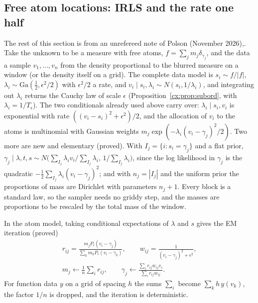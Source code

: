 \subsection{Free atom locations: IRLS and the rate one half}\label{cx:sec:irls}

The rest of this section is from an unrefereed note of Polson (November 2026),. Take the unknown to be a measure with free atoms, $f=\sum_jm_j\delta_{\gamma_j}$, and the data a sample $v_1,\dots,v_n$ from the density proportional to the blurred measure on a window (or the density itself on a grid). The complete data model is $s_i\sim f/|f|$, $\lambda_i\sim\mathrm{Ga}(\tfrac12,\epsilon^2/2)$ with $\epsilon^2/2$ a rate, and $v_i\mid s_i,\lambda_i\sim N(s_i,1/\lambda_i)$, and integrating out $\lambda_i$ returns the Cauchy law of scale $\epsilon$ (Proposition~\ref{cx:prop:subord}, with $\lambda_i=1/T_\epsilon$). The two conditionals already used above carry over: $\lambda_i\mid s_i,v_i$ is exponential with rate $((v_i-s_i)^2+\epsilon^2)/2$, and the allocation of $v_i$ to the atoms is multinomial with Gaussian weights $m_j\exp(-\lambda_i(v_i-\gamma_j)^2/2)$. Two more are new and elementary (proved). With $I_j=\{i:s_i=\gamma_j\}$ and a flat prior, $\gamma_j\mid\lambda,t,s\sim N\bigl(\sum_{I_j}\lambda_iv_i/\sum_{I_j}\lambda_i,\,1/\sum_{I_j}\lambda_i\bigr)$, since the log likelihood in $\gamma_j$ is the quadratic $-\tfrac12\sum_{I_j}\lambda_i(v_i-\gamma_j)^2$; and with $n_j=|I_j|$ and the uniform prior the proportions of mass are Dirichlet with parameters $n_j+1$. Every block is a standard law, so the sampler needs no griddy step, and the masses are proportions to be rescaled by the total mass of the window.

\begin{corollary}\label{cx:cor:irls}
In the atom model, taking conditional expectations of $\lambda$ and $s$ gives the EM iteration (proved)
\begin{gather*}
r_{ij}=\frac{m_jP_\epsilon(v_i-\gamma_j)}{\sum_km_kP_\epsilon(v_i-\gamma_k)},\qquad w_{ij}=\frac1{(v_i-\gamma_j)^2+\epsilon^2},\\
m_j\leftarrow\frac1n\sum_ir_{ij},\qquad\gamma_j\leftarrow\frac{\sum_ir_{ij}w_{ij}v_i}{\sum_ir_{ij}w_{ij}}.
\end{gather*}
For function data $y$ on a grid of spacing $h$ the sums $\sum_i$ become $\sum_kh\,y(v_k)$, the factor $1/n$ is dropped, and the iteration is deterministic.
\end{corollary}

